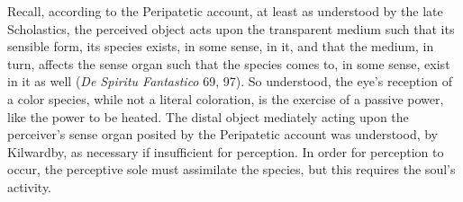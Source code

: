 Recall, according to the Peripatetic account, at least as understood by the late Scholastics, the perceived object acts upon the transparent medium such that its sensible form, its species exists, in some sense, in it, and that the medium, in turn, affects the sense organ such that the species comes to, in some sense, exist in it as well (\emph{De Spiritu Fantastico} 69, 97). So understood, the eye's reception of a color species, while not a literal coloration, is the exercise of a passive power, like the power to be heated. The distal object mediately acting upon the perceiver's sense organ posited by the Peripatetic account was understood, by Kilwardby, as necessary if insufficient for perception. In order for perception to occur, the perceptive sole must assimilate the species, but this requires the soul's activity. 





